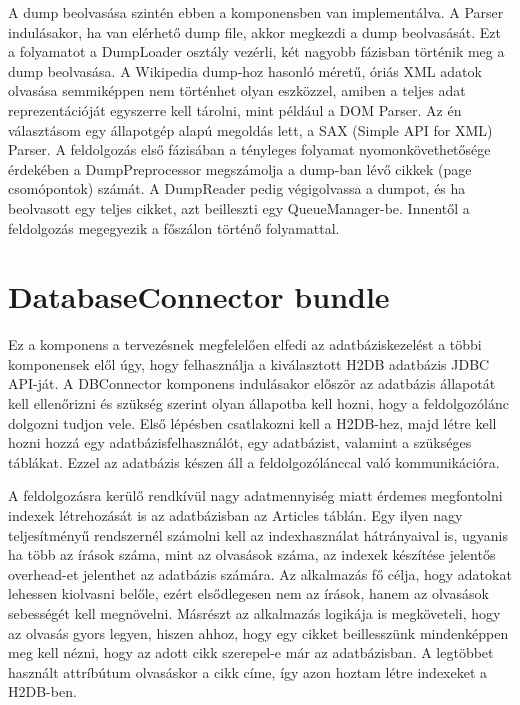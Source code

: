 A dump beolvasása szintén ebben a komponensben van implementálva. A Parser indulásakor, ha van elérhető dump file, akkor megkezdi a dump beolvasását. Ezt a folyamatot a DumpLoader osztály vezérli, két nagyobb fázisban történik meg a dump beolvasása. A Wikipedia dump-hoz hasonló méretű, óriás XML adatok olvasása semmiképpen nem történhet olyan eszközzel, amiben a teljes adat reprezentációját egyszerre kell tárolni, mint például a DOM Parser. Az én választásom egy állapotgép alapú megoldás lett, a SAX (Simple API for XML) Parser. A feldolgozás első fázisában a tényleges folyamat nyomonkövethetősége érdekében a DumpPreprocessor megszámolja a dump-ban lévő cikkek (page csomópontok) számát. A DumpReader pedig végigolvassa a dumpot, és ha beolvasott egy teljes cikket, azt beilleszti egy QueueManager-be. Innentől a feldolgozás megegyezik a főszálon történő folyamattal.


\section{DatabaseConnector bundle}
\label{sec:dbconnectorbundle}

Ez a komponens a tervezésnek megfelelően elfedi az adatbáziskezelést a többi komponensek elől úgy, hogy felhasználja a kiválasztott H2DB adatbázis JDBC API-ját. A DBConnector komponens indulásakor először az adatbázis állapotát kell ellenőrizni és szükség szerint olyan állapotba kell hozni, hogy a feldolgozólánc dolgozni tudjon vele. Első lépésben csatlakozni kell a H2DB-hez, majd létre kell hozni hozzá egy adatbázisfelhasználót, egy adatbázist, valamint a szükséges táblákat. Ezzel az adatbázis készen áll a feldolgozólánccal való kommunikációra.

A feldolgozásra kerülő rendkívül nagy adatmennyiség miatt érdemes megfontolni indexek létrehozását is az adatbázisban az Articles táblán. Egy ilyen nagy teljesítményű rendszernél számolni kell az indexhasználat hátrányaival is, ugyanis ha több az írások száma, mint az olvasások száma, az indexek készítése jelentős overhead-et jelenthet az adatbázis számára. Az alkalmazás fő célja, hogy adatokat lehessen kiolvasni belőle, ezért elsődlegesen nem az írások, hanem az olvasások sebességét kell megnövelni. Másrészt az alkalmazás logikája is megköveteli, hogy az olvasás gyors legyen, hiszen ahhoz, hogy egy cikket beillesszünk mindenképpen meg kell nézni, hogy az adott cikk szerepel-e már az adatbázisban. A legtöbbet használt attríbútum olvasáskor a cikk címe, így azon hoztam létre indexeket a H2DB-ben.

